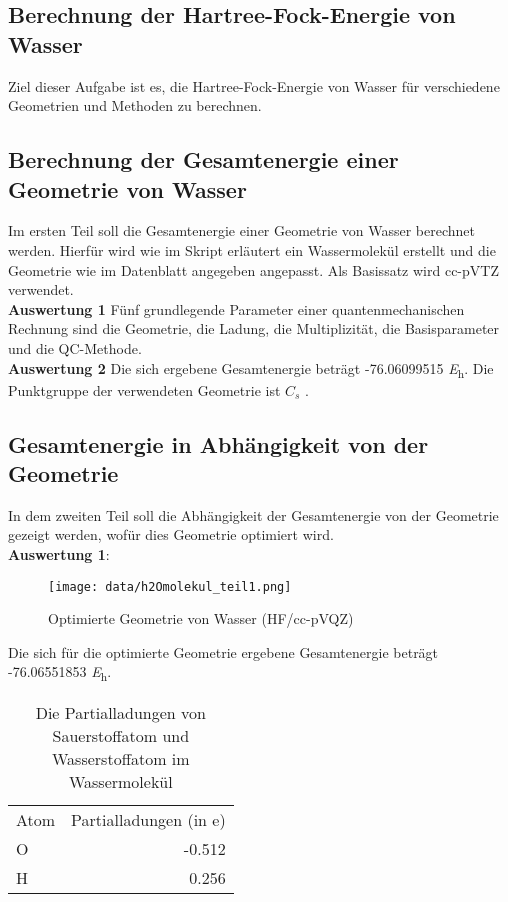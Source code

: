 \documentclass[12pt]{article}
\begin{document}
\begin{onehalfspace}

\section{Berechnung der Hartree-Fock-Energie von Wasser}
Ziel dieser Aufgabe ist es, die Hartree-Fock-Energie von Wasser für verschiedene Geometrien und Methoden zu berechnen.
\subsection{Berechnung der Gesamtenergie einer Geometrie von Wasser}
Im ersten Teil soll die Gesamtenergie einer Geometrie von Wasser berechnet werden. Hierfür wird wie im Skript erläutert ein Wassermolekül erstellt und die Geometrie wie im Datenblatt angegeben angepasst. Als Basissatz wird cc-pVTZ verwendet. \\
\textbf{Auswertung 1} Fünf grundlegende Parameter einer quantenmechanischen Rechnung sind die Geometrie, die Ladung, die Multiplizität, die Basisparameter und die QC-Methode. \\
\textbf{Auswertung 2} Die sich ergebene Gesamtenergie beträgt -76.06099515 \si{\hartree}.
Die Punktgruppe der verwendeten Geometrie ist $C _s$ .\\
\subsection{Gesamtenergie in Abhängigkeit von der Geometrie}
In dem zweiten Teil soll die Abhängigkeit der Gesamtenergie von der Geometrie gezeigt werden, wofür dies Geometrie optimiert wird.\\
\textbf{Auswertung 1}:\\
\begin{figure}[!htbp]
\centering
\texttt{[image: data/h2Omolekul\_teil1.png]}
  \caption{Optimierte Geometrie von Wasser (HF/cc-pVQZ)}
\end{figure}
\noindent
Die sich für die optimierte Geometrie ergebene Gesamtenergie beträgt -76.06551853 \si{\hartree}. \\
\begin{table}[htbp]
\centering
\caption{Die Partialladungen von Sauerstoffatom und Wasserstoffatom im Wassermolekül}
\begin{tabular}{lr}
\toprule
Atom &  Partialladungen (in e)\\
O & -0.512\\
H & 0.256\\
\midrule
\bottomrule


\end{tabular}
\end{table}
\end{onehalfspace}
\end{document}
